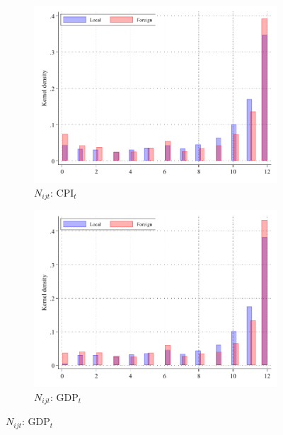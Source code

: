\documentclass[letterpaper,12pt]{article}
\begin{document}
\begin{figure}[H]
	
		\begin{subfigure}[b]{0.48\textwidth}
		\centering
		\includegraphics[width=1\linewidth]{../output/figures/cpi_current_N_density}
		\caption{$N_{ijt}$: $\text{CPI}_t$ }
		\label{fig:cpi_current_N_density}
	\end{subfigure}
	\hfill
	\begin{subfigure}[b]{0.48\textwidth}
		\centering
		\includegraphics[width=1\linewidth]{../output/figures/gdp_current_N_density}
		\caption{$N_{ijt}$: $\text{GDP}_t$}
		\label{fig:gdp_current_N_density}
		\end{subfigure}
	

\end{figure}
\end{document}

